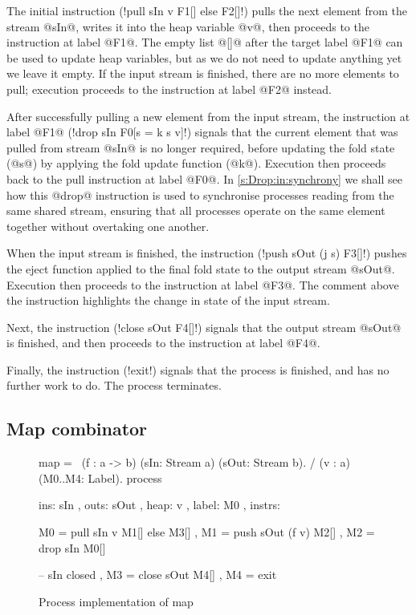 The initial instruction (\lstiproc!pull sIn v F1[] else F2[]!) pulls the next element from the stream @sIn@, writes it into the heap variable @v@, then proceeds to the instruction at label @F1@.
The empty list @[]@ after the target label @F1@ can be used to update heap variables, but as we do not need to update anything yet we leave it empty. 
If the input stream is finished, there are no more elements to pull; execution proceeds to the instruction at label @F2@ instead.

After successfully pulling a new element from the input stream, the instruction at label @F1@ (\lstiproc!drop sIn F0[s = k s v]!) signals that the current element that was pulled from stream @sIn@ is no longer required, before updating the fold state (@s@) by applying the fold update function (@k@).
Execution then proceeds back to the pull instruction at label @F0@.
In \cref{s:Drop:in:synchrony} we shall see how this @drop@ instruction is used to synchronise processes reading from the same shared stream, ensuring that all processes operate on the same element together without overtaking one another.

When the input stream is finished, the instruction (\lstiproc!push sOut (j s) F3[]!) pushes the eject function applied to the final fold state to the output stream @sOut@.
Execution then proceeds to the instruction at label @F3@.
The comment above the instruction highlights the change in state of the input stream.

Next, the instruction (\lstiproc!close sOut F4[]!) signals that the output stream @sOut@ is finished, and then proceeds to the instruction at label @F4@.

Finally, the instruction (\lstiproc!exit!) signals that the process is finished, and has no further work to do.
The process terminates.

\subsection{Map combinator}

\begin{figure}
\begin{process}
map 
  = \ (f  : a -> b)
      (sIn: Stream a) (sOut: Stream b). 
    / (v  : a)        (M0..M4: Label).
    process
     { ins:    { sIn  }
     , outs:   { sOut }
     , heap:   { v }
     , label:  M0
     , instrs: { M0 = pull  sIn     v  M1[] else M3[]
               , M1 = push  sOut (f v) M2[]
               , M2 = drop  sIn        M0[]

               -- sIn closed
               , M3 = close sOut       M4[]
               , M4 = exit } }
\end{process}
\caption{Process implementation of map}
\label{figs/procs/impl/map}
\end{figure}

